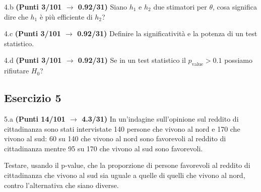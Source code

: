 \documentclass[
  11pt,
]{book}
\theoremstyle{mytheoremstyle}
\theoremstyle{mydefstyle}
\begin{document}
4.b \textbf{(Punti 3/101 \(\rightarrow\) 0.92/31)} Siano \(h_1\) e \(h_2\) due stimatori per \(\theta\), cosa significa dire che \(h_1\) è più efficiente di \(h_2\)?

4.c \textbf{(Punti 3/101 \(\rightarrow\) 0.92/31)} Definire la significatività e la potenza di un test statistico.

4.d \textbf{(Punti 3/101 \(\rightarrow\) 0.92/31)} Se in un test statistico il \(p_\text{value}>0.1\) possiamo rifiutare \(H_0\)?

\subsection{Esercizio 5}\label{esercizio-5-9}

5.a \textbf{(Punti 14/101 \(\rightarrow\) 4.3/31)} In un'indagine sull'opinione sul reddito di cittadinanza sono stati intervistate 140 persone che vivono al nord e 170 che vivono al sud: 60 su 140 che vivono al nord sono favorevoli al reddito di cittadinanza mentre 95 su 170 che vivono al sud sono favorevoli.

Testare, usando il p-value, che la proporzione di persone favorevoli al reddito di cittadinanza che vivono al sud sia uguale a quelle di quelli che vivono al nord, contro l'alternativa che siano diverse.
\end{document}
